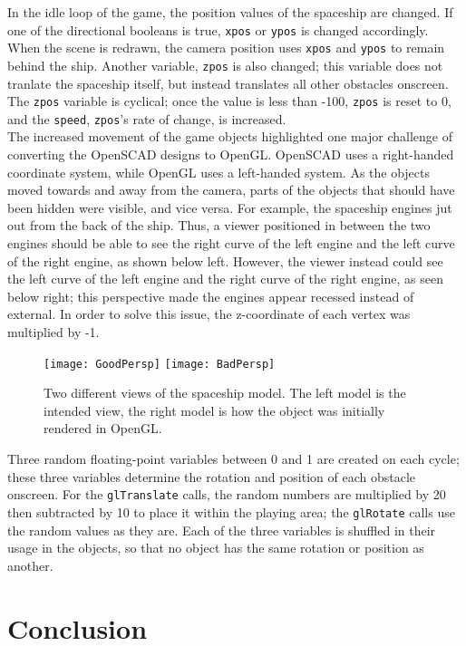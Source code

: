 \documentclass[12pt]{article}
\begin{document}
\begin{doublespace}
In the idle loop of the game, the position values of the spaceship are changed. If one of the directional booleans is true, \texttt{xpos} or \texttt{ypos} is changed accordingly. When the scene is redrawn, the camera position uses \texttt{xpos} and \texttt{ypos} to remain behind the ship. Another variable, \texttt{zpos} is also changed; this variable does not tranlate the spaceship itself, but instead translates all other obstacles onscreen. The \texttt{zpos} variable is cyclical; once the value is less than -100, \texttt{zpos} is reset to 0, and the \texttt{speed}, \texttt{zpos}'s rate of change, is increased.\\

The increased movement of the game objects highlighted one major challenge of converting the OpenSCAD designs to OpenGL. OpenSCAD uses a right-handed coordinate system, while OpenGL uses a left-handed system. As the objects moved towards and away from the camera, parts of the objects that should have been hidden were visible, and vice versa. For example, the spaceship engines jut out from the back of the ship. Thus, a viewer positioned in between the two engines should be able to see the right curve of the left engine and the left curve of the right engine, as shown below left. However, the viewer instead could see the left curve of the left engine and the right curve of the right engine, as seen below right; this perspective made the engines appear recessed instead of external. In order to solve this issue, the z-coordinate of each vertex was multiplied by -1. 
\begin{figure}[h]
  \texttt{[image: GoodPersp]}
  \texttt{[image: BadPersp]}
  \centering
  \caption{Two different views of the spaceship model. The left model is the intended view, the right model is how the object was initially rendered in OpenGL.}
\end{figure}

Three random floating-point variables between 0 and 1 are created on each cycle; these three variables determine the rotation and position of each obstacle onscreen. For the \texttt{glTranslate} calls, the random numbers are multiplied by 20 then subtracted by 10 to place it within the playing area; the \texttt{glRotate} calls use the random values as they are. Each of the three variables is shuffled in their usage in the objects, so that no object has the same rotation or position as another.
\section{Conclusion}

\newpage
\end{doublespace}
\end{document}
